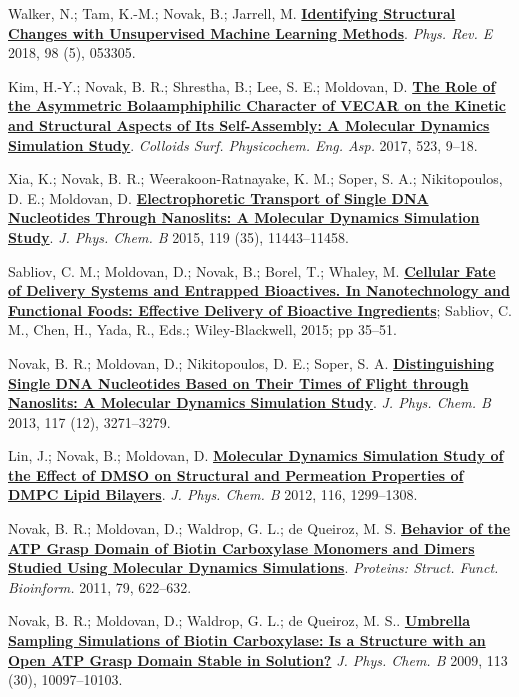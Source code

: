 \begin{cventries}
{\begin{cvitems}
       \item {Walker, N.; Tam, K.-M.; Novak, B.; Jarrell, M. \href{https://doi.org/10.1103/PhysRevE.98.053305}{\textbf{Identifying Structural Changes with Unsupervised Machine Learning Methods}}. \textit{Phys. Rev. E} 2018, 98 (5), 053305.}
        \item {Kim, H.-Y.; Novak, B. R.; Shrestha, B.; Lee, S. E.; Moldovan, D. \href{https://doi.org/10.1016/j.colsurfa.2017.03.060}{\textbf{The Role of the Asymmetric Bolaamphiphilic Character of VECAR on the Kinetic and Structural Aspects of Its Self-Assembly: A Molecular Dynamics Simulation Study}}. \textit{Colloids Surf. Physicochem. Eng. Asp.} 2017, 523, 9–18.}
        \item {Xia, K.; Novak, B. R.; Weerakoon-Ratnayake, K. M.; Soper, S. A.; Nikitopoulos, D. E.; Moldovan, D. \href{https://doi.org/10.1021/acs.jpcb.5b02798}{\textbf{Electrophoretic Transport of Single DNA Nucleotides Through Nanoslits: A Molecular Dynamics Simulation Study}}. \textit{J. Phys. Chem. B} 2015, 119 (35), 11443–11458. }
        \item {Sabliov, C. M.; Moldovan, D.; Novak, B.; Borel, T.; Whaley, M. \href{https://onlinelibrary.wiley.com/doi/pdf/10.1002/9781118462157#page=47}{\textbf{Cellular Fate of Delivery Systems and Entrapped Bioactives. In Nanotechnology and Functional Foods: Effective Delivery of Bioactive Ingredients}}; Sabliov, C. M., Chen, H., Yada, R., Eds.; Wiley-Blackwell, 2015; pp 35–51.}
        \item {Novak, B. R.; Moldovan, D.; Nikitopoulos, D. E.; Soper, S. A. \href{https://doi.org/10.1021/jp309486c}{\textbf{Distinguishing Single DNA Nucleotides Based on Their Times of Flight through Nanoslits: A Molecular Dynamics Simulation Study}}. \textit{J. Phys. Chem. B} 2013, 117 (12), 3271–3279. }
        \item {Lin, J.; Novak, B.; Moldovan, D. \href{https://doi.org/10.1021/jp208145b}{\textbf{Molecular Dynamics Simulation Study of the Effect of DMSO on Structural and Permeation Properties of DMPC Lipid Bilayers}}. \textit{J. Phys. Chem. B} 2012, 116, 1299–1308. }
        \item {Novak, B. R.; Moldovan, D.; Waldrop, G. L.; de Queiroz, M. S. \href{https://doi.org/10.1002/prot.22910}{\textbf{Behavior of the ATP Grasp Domain of Biotin Carboxylase Monomers and Dimers Studied Using Molecular Dynamics Simulations}}. \textit{Proteins: Struct. Funct. Bioinform.} 2011, 79, 622–632.}
        \item{Novak, B. R.; Moldovan, D.; Waldrop, G. L.; de Queiroz, M. S.. \href{https://doi.org/10.1021/jp810650q}{\textbf{Umbrella Sampling Simulations of Biotin Carboxylase: Is a Structure with an Open ATP Grasp Domain Stable in Solution?}} \textit{J. Phys. Chem. B} 2009, 113 (30), 10097–10103.}

\end{cvitems}}
\end{cventries}

